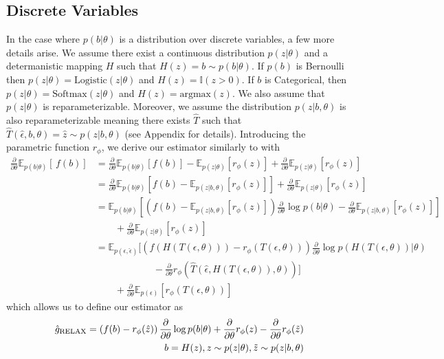 \documentclass{article}
\newcommand{\discreteDist}{p(b|\theta)}
\newcommand{\loss}{f(b)}
\newcommand{\expectedLoss}{\mathbb{E}_{\discreteDist{}} \! \left[ \, \loss{} \right]}
\newcommand{\E}{\mathbb{E}}
\newcommand{\PT}{\frac{\partial}{\partial \theta}}
\begin{document}
\subsection{Discrete Variables}
In the case where $p(b|\theta)$ is a distribution over discrete variables, a few more details arise. We assume there exist a continuous distribution $p(z|\theta)$ and a determanistic mapping $H$ such that $H(z) = b \sim p(b|\theta)$. If $p(b)$ is Bernoulli then $p(z|\theta) = \text{Logistic}(z|\theta)$ and $H(z) = \mathbb{I}(z>0)$. If $b$ is Categorical, then $p(z|\theta) = \text{Softmax}(z|\theta)$ and $H(z) = \text{argmax}(z)$. We also assume that $p(z|\theta)$ is reparameterizable. Moreover, we assume the distribution $p(z|b, \theta)$ is also reparameterizable meaning there exists $\hat{T}$ such that $\hat{T}(\hat{\epsilon}, b, \theta) = \hat{z} \sim p(z|b, \theta)$ (see Appendix for details). Introducing the parametric function $r_\phi$, we derive our estimator similarly to \cite{tucker2017rebar} with
\begin{align}
\PT \expectedLoss{} &= \PT \E_{p(b|\theta)}\left[ f(b) \right] - \E_{p(z|\theta)}\left[ r_\phi(z) \right] + \PT\E_{p(z|\theta)}\left[ r_\phi(z) \right]\nonumber\\
&= \PT \E_{p(b|\theta)}\left[ f(b) - \E_{p(z|b, \theta)}\left[ r_\phi(z) \right]  \right] + \PT\E_{p(z|\theta)}\left[ r_\phi(z) \right]\nonumber\\
&= \E_{p(b|\theta)}\left[\left( f(b) - \E_{p(z|b, \theta)}\left[r_\phi(z) \right] \right)\PT \log p(b|\theta)  - \PT \E_{p(z|b, \theta)}\left[r_\phi(z) \right] \right]\nonumber\\
&\qquad + \PT\E_{p(z|\theta)}\left[ r_\phi(z) \right]\nonumber\\
&= \E_{p(\epsilon, \hat{\epsilon})}\Big[\left( f(H(T(\epsilon, \theta))) - r_\phi(T(\epsilon, \theta))  \right) \PT \log p(H(T(\epsilon, \theta))|\theta) \nonumber\\
&\qquad\qquad\qquad - \PT r_\phi(\hat{T}(\hat{\epsilon}, H(T(\epsilon, \theta)), \theta)) \Big]\nonumber\\
&\qquad + \PT\E_{p(\epsilon)}\left[ r_\phi(T(\epsilon, \theta)) \right]\nonumber
\end{align}
which allows us to define our estimator as
\begin{align}
\hat g_\textnormal{RELAX} = \left(f(b) -r_\phi(\hat{z})\right)\PT \log p(b|\theta) + \PT r_\phi(z) - \PT r_\phi (\tilde{z}) \nonumber\\
\qquad b = H(z), z \sim p(z|\theta), \tilde{z} \sim p(z|b, \theta)
\end{align}
\end{document}

